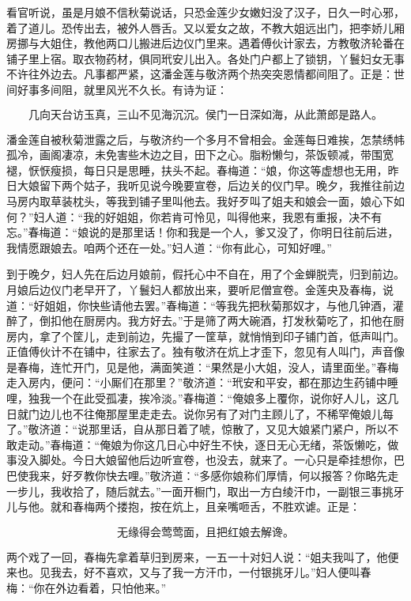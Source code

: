 看官听说，虽是月娘不信秋菊说话，只恐金莲少女嫩妇没了汉子，日久一时心邪，着了道儿。恐传出去，被外人唇舌。又以爱女之故，不教大姐远出门，把李娇儿厢房挪与大姐住，教他两口儿搬进后边仪门里来。遇着傅伙计家去，方教敬济轮番在铺子里上宿。取衣物药材，俱同玳安儿出入。各处门户都上了锁钥，丫鬟妇女无事不许往外边去。凡事都严紧，这潘金莲与敬济两个热突突恩情都间阻了。正是：世间好事多间阻，就里风光不久长。有诗为证：

\[
几向天台访玉真，三山不见海沉沉。
侯门一日深如海，从此萧郎是路人。
\]

潘金莲自被秋菊泄露之后，与敬济约一个多月不曾相会。金莲每日难挨，怎禁绣帏孤冷，画阁凄凉，未免害些木边之目，田下之心。脂粉懒匀，茶饭顿减，带围宽褪，恹恹瘦损，每日只是思睡，扶头不起。春梅道：“娘，你这等虚想也无用，昨日大娘留下两个姑子，我听见说今晚要宣卷，后边关的仪门早。晚夕，我推往前边马房内取草装枕头，等我到铺子里叫他去。我好歹叫了姐夫和娘会一面，娘心下如何？”妇人道：“我的好姐姐，你若肯可怜见，叫得他来，我恩有重报，决不有忘。”春梅道：“娘说的是那里话！你和我是一个人，爹又没了，你明日往前后进，我情愿跟娘去。咱两个还在一处。”妇人道：“你有此心，可知好哩。”

到于晚夕，妇人先在后边月娘前，假托心中不自在，用了个金蝉脱壳，归到前边。月娘后边仪门老早开了，丫鬟妇人都放出来，要听尼僧宣卷。金莲央及春梅，说道：“好姐姐，你快些请他去罢。”春梅道：“等我先把秋菊那奴才，与他几钟酒，灌醉了，倒扣他在厨房内。我方好去。”于是筛了两大碗酒，打发秋菊吃了，扣他在厨房内，拿了个筐儿，走到前边，先撮了一筐草，就悄悄到印子铺门首，低声叫门。正值傅伙计不在铺中，往家去了。独有敬济在炕上才歪下，忽见有人叫门，声音像是春梅，连忙开门，见是他，满面笑道：“果然是小大姐，没人，请里面坐。”春梅走入房内，便问：“小厮们在那里？”敬济道：“玳安和平安，都在那边生药铺中睡哩，独我一个在此受孤凄，挨冷淡。”春梅道：“俺娘多上覆你，说你好人儿，这几日就门边儿也不往俺那屋里走走去。说你另有了对门主顾儿了，不稀罕俺娘儿每了。”敬济道：“说那里话，自从那日着了唬，惊散了，又见大娘紧门紧户，所以不敢走动。”春梅道：“俺娘为你这几日心中好生不快，逐日无心无绪，茶饭懒吃，做事没入脚处。今日大娘留他后边听宣卷，也没去，就来了。一心只是牵挂想你，巴巴使我来，好歹教你快去哩。”敬济道：“多感你娘称们厚情，何以报答？你略先走一步儿，我收拾了，随后就去。”一面开橱门，取出一方白绫汗巾，一副银三事挑牙儿与他。就和春梅两个搂抱，按在炕上，且亲嘴咂舌，不胜欢谑。正是：

\[
无缘得会莺莺面，且把红娘去解谗。
\]

两个戏了一回，春梅先拿着草归到房来，一五一十对妇人说：“姐夫我叫了，他便来也。见我去，好不喜欢，又与了我一方汗巾，一付银挑牙儿。”妇人便叫春梅：“你在外边看着，只怕他来。”

